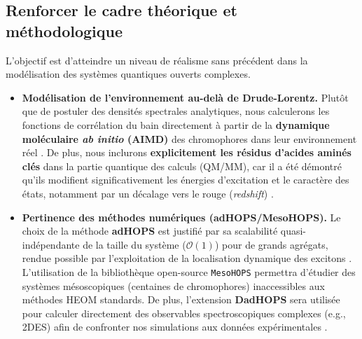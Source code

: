 \documentclass[12pt, a4paper]{article}
\begin{document}
%
%

\subsection{Renforcer le cadre théorique et méthodologique}

L'objectif est d'atteindre un niveau de réalisme sans précédent dans la modélisation des systèmes quantiques ouverts complexes.
\begin{itemize}
    \item \textbf{Modélisation de l'environnement au-delà de Drude-Lorentz.} Plutôt que de postuler des densités spectrales analytiques, nous calculerons les fonctions de corrélation du bain directement à partir de la \textbf{dynamique moléculaire \textit{ab initio} (AIMD)} des chromophores dans leur environnement réel \cite{rangel2002, lee2015}. De plus, nous inclurons \textbf{explicitement les résidus d'acides aminés clés} dans la partie quantique des calculs (QM/MM), car il a été démontré qu'ils modifient significativement les énergies d'excitation et le caractère des états, notamment par un décalage vers le rouge (\textit{redshift}) \cite{wang2018,Volpert2023}.

    \item \textbf{Pertinence des méthodes numériques (adHOPS/MesoHOPS).} Le choix de la méthode \textbf{adHOPS} est justifié par sa scalabilité quasi-indépendante de la taille du système ($\mathcal{O}(1)$) pour de grands agrégats, rendue possible par l'exploitation de la localisation dynamique des excitons \cite{varvelo2021, Citty2024}. L'utilisation de la bibliothèque open-source \texttt{MesoHOPS} \cite{Citty2024} permettra d'étudier des systèmes mésoscopiques (centaines de chromophores) inaccessibles aux méthodes HEOM standards. De plus, l'extension \textbf{DadHOPS} sera utilisée pour calculer directement des observables spectroscopiques complexes (e.g., 2DES) afin de confronter nos simulations aux données expérimentales \cite{Gera2023, Chen2022a}.
\end{itemize}
\end{document}
